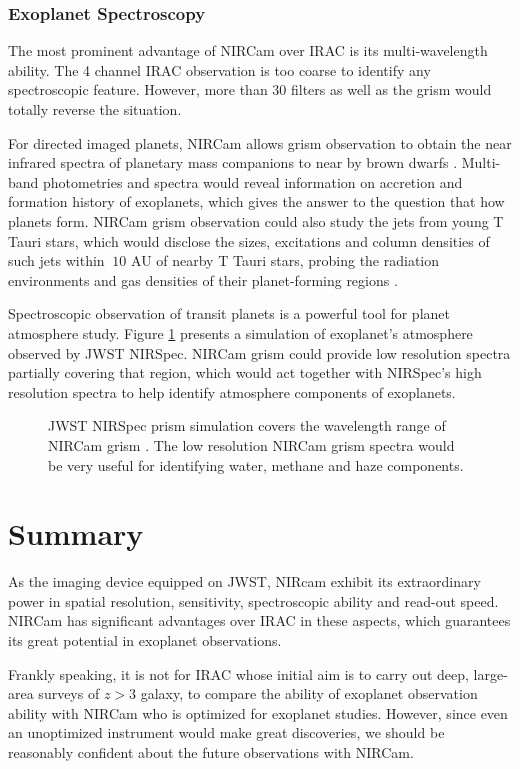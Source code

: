 \documentclass[preprint, 12pt]{aastex} \synctex=1
\begin{document}
\subsubsection{Exoplanet Spectroscopy} The most prominent advantage of
NIRCam over IRAC is its multi-wavelength ability. The 4 channel IRAC
observation is too coarse to identify any spectroscopic
feature. However, more than 30 filters as well as the grism
would totally reverse the situation.

For directed imaged planets, NIRCam allows grism observation to obtain
the near infrared spectra of planetary mass companions to near by
brown dwarfs \citep{2005SPIE.5905..185G}. Multi-band photometries and
spectra would reveal information on accretion and formation history of
exoplanets, which gives the answer to the question that how planets
form. NIRCam grism observation could also study the jets from young T
Tauri stars, which would disclose the sizes, excitations and column
densities of such jets within $~10$ AU of nearby T Tauri stars,
probing the radiation environments and gas densities of their
planet-forming regions \citep{2005SPIE.5905..185G}.\par

Spectroscopic observation of transit planets is a powerful tool for
planet atmosphere study. Figure \ref{fig:spec} presents a simulation
of exoplanet's atmosphere observed by JWST NIRSpec. NIRCam grism could
provide low resolution spectra partially covering that region, which
would act together with NIRSpec's high resolution spectra to help
identify atmosphere components of exoplanets.
\begin{figure}[h] \centering {}
  \caption{JWST NIRSpec prism simulation covers the wavelength range
of NIRCam grism \citep{2013ApJ...775...80F}. The low resolution NIRCam
grism spectra would be very useful for identifying water, methane and
haze components.}
  \label{fig:spec}
\end{figure}

\section{Summary} As the imaging device equipped on JWST, NIRcam
exhibit its extraordinary power in spatial resolution, sensitivity,
spectroscopic ability and read-out speed. NIRCam has significant
advantages over IRAC in these aspects, which guarantees its great
potential in exoplanet observations.

Frankly speaking, it is not for IRAC whose initial aim is to carry out
deep, large-area surveys of $z>3$ galaxy, to compare the ability of
exoplanet observation ability with NIRCam who is optimized for
exoplanet studies. However, since even an unoptimized instrument would
make great discoveries, we should be reasonably confident about the
future observations with NIRCam.

\nocite{*}

\end{document}
